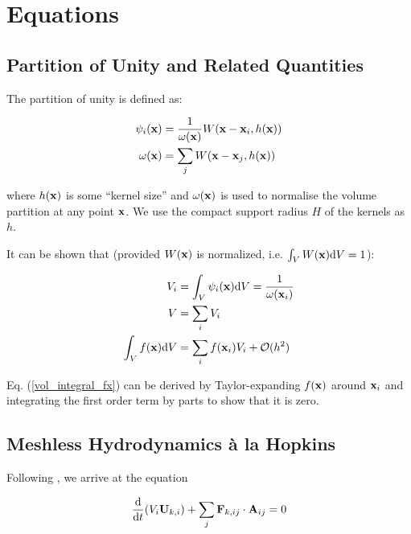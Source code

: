 

\section{Equations}



\subsection{Partition of Unity and Related Quantities}

The partition of unity is defined as:

\begin{align}
	\psi_i(\x) &= \frac{1}{\omega(\x)} W(\x - \x_i, h(\x))		\label{psi} \\
	\omega(\x) &= \sum_j W(\x - \x_j, h(\x)) 					\label{omega}
\end{align}

where $h(\mathbf{x})$ is some ``kernel size'' and $\omega(\mathbf{x})$ is used to normalise the volume partition at any point $\mathbf{x}$.
We use the compact support radius $H$ of the kernels as $h$.





It can be shown that (provided $W(\mathbf{x})$ is normalized, i.e. $\int_V W(\mathbf{x}) \mathrm{d} V = 1$):

\begin{align}
	V_i &= \int_V \psi_i(\x) \de V = \frac{1}{\omega(\x_i)} \\ 					\label{psi_volume_integral}
	V &= \sum_i V_i \\
	\int_V f(\x) \D V &= \sum_i f(\x_i) V_i + \mathcal{O}(h^2) 					\label{vol_integral_fx}
\end{align}

Eq. (\ref{vol_integral_fx}) can be derived by Taylor-expanding $f(\mathbf{x})$ around $\mathbf{x}_i$ and integrating the first order term by parts to show that it is zero.







\subsection{Meshless Hydrodynamics \`a la Hopkins}



Following \cite{hopkinsGIZMONewClass2015}, we arrive at the equation

\begin{equation}
	\frac{\D}{\D t} (V_i \U_{k,i}) + \sum_j \F_{k,ij} \cdot \Aijm = 0
\end{equation}


